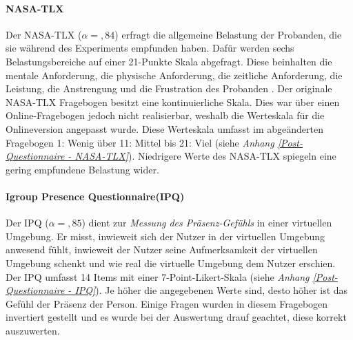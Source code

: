 \documentclass[a4paper,11pt]{article}%
\renewcommand{\\}{\vspace*{0.5\baselineskip} \newline}
\begin{document}
		\paragraph{NASA-TLX}
Der NASA-TLX ($\alpha =,84$) erfragt die allgemeine Belastung der Probanden, die sie während des Experiments empfunden haben. Dafür werden sechs Belastungsbereiche auf einer 21-Punkte Skala abgefragt. Diese beinhalten die mentale Anforderung, die physische Anforderung, die zeitliche Anforderung, die Leistung, die Anstrengung und die Frustration des Probanden \citep{NASATLX}.
Der originale NASA-TLX Fragebogen besitzt eine kontinuierliche Skala. Dies war über einen Online-Fragebogen jedoch nicht realisierbar, weshalb die Werteskala für die Onlineversion angepasst wurde. Diese Werteskala umfasst im abgeänderten Fragebogen 1: \glqq{}Wenig\dq{} über 11: \glqq{}Mittel\dq{} bis 21: \glqq{}Viel\dq{} (siehe \textit{Anhang \ref{Post-Questionnaire - NASA-TLX}}). Niedrigere Werte des NASA-TLX spiegeln eine gering empfundene Belastung wider.

		\paragraph{Igroup Presence Questionnaire(IPQ)}
Der IPQ ($\alpha =,85$) dient zur \textit{Messung des Präsenz-Gefühls} in einer virtuellen Umgebung. Er misst, inwieweit sich der Nutzer in der virtuellen Umgebung anwesend fühlt, inwieweit der Nutzer seine Aufmerksamkeit der virtuellen Umgebung schenkt und wie real die virtuelle Umgebung dem Nutzer erschien. Der IPQ umfasst 14 Items mit einer 7-Point-Likert-Skala (siehe \textit{Anhang \ref{Post-Questionnaire - IPQ}}). Je höher die angegebenen Werte sind, desto höher ist das Gefühl der Präsenz der Person. Einige Fragen wurden in diesem Fragebogen invertiert gestellt und es wurde bei der Auswertung drauf geachtet, diese korrekt auszuwerten.
		
\end{document}
